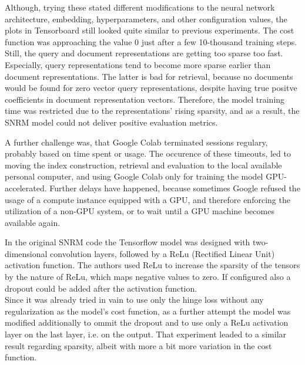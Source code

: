 Although, trying these stated different modifications to the neural network architecture, 
    embedding, hyperparameters, and other configuration values,
    the plots in Tensorboard still looked quite similar to previous experiments.
The cost function was approaching the value 0 just after a few 10-thousand training steps.
Still, the query and document representations are getting too sparse too fast.
Especially, query representations tend to become more sparse earlier than document representations.
The latter is bad for retrieval, because no documents would be found for zero vector query representations, 
    despite having true positve coefficients in document representation vectors.
Therefore, the model training time was restricted due to the representations' rising sparsity,
    and as a result, the SNRM model could not deliver positive evaluation metrics.

A further challenge was, that Google Colab terminated sessions regulary, probably based on time spent or usage.
The occurence of these timeouts, led to moving the index construction, retrieval and evaluation to the 
    local available personal computer, and using Google Colab only for training the model GPU-accelerated.
Further delays have happened, because sometimes Google refused the usage of a compute instance equipped with a GPU,
    and therefore enforcing the utilization of a non-GPU system, 
    or to wait until a GPU machine becomes available again.

In the original SNRM code the Tensorflow model was designed with two-dimensional convolution layers, 
    followed by a ReLu (Rectified Linear Unit) activation function.
The authors used ReLu to increase the sparsity of the tensors by the nature of ReLu,
    which maps negative values to zero.
If configured also a dropout could be added after the activation function.\\
Since it was already tried in vain to use only the hinge loss without any regularization as the model's cost function,
    as a further attempt the model was modified additionally to ommit the dropout
    and to use only a ReLu activation layer on the last layer, i.e. on the output.
That experiment leaded to a similar result regarding sparsity, albeit with more a bit more variation in the cost function.


